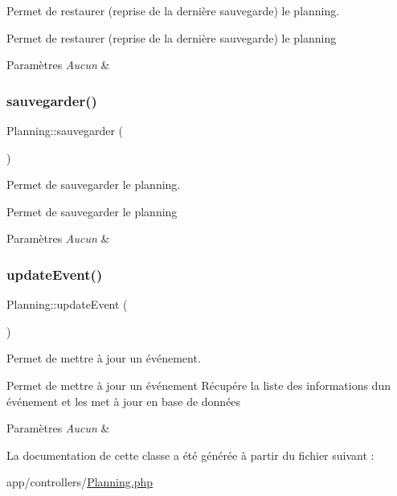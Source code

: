 Permet de restaurer (reprise de la dernière sauvegarde) le planning. 

Permet de restaurer (reprise de la dernière sauvegarde) le planning 
\begin{DoxyParams}{Paramètres}
{\em Aucun} & \\
\hline
\end{DoxyParams}
\mbox{\label{class_planning_aeb1146ae1c0a9e5f31214b9dbced1140}} 
\subsubsection{\texorpdfstring{sauvegarder()}{sauvegarder()}}
{\footnotesize\ttfamily Planning\+::sauvegarder (\begin{DoxyParamCaption}{ }\end{DoxyParamCaption})}



Permet de sauvegarder le planning. 

Permet de sauvegarder le planning 
\begin{DoxyParams}{Paramètres}
{\em Aucun} & \\
\hline
\end{DoxyParams}
\mbox{\label{class_planning_a98d895eb72d210bad07437f5b0a395b1}} 
\subsubsection{\texorpdfstring{update\+Event()}{updateEvent()}}
{\footnotesize\ttfamily Planning\+::update\+Event (\begin{DoxyParamCaption}{ }\end{DoxyParamCaption})}



Permet de mettre à jour un événement. 

Permet de mettre à jour un événement Récupére la liste des informations d\textquotesingle{}un événement et les met à jour en base de données 
\begin{DoxyParams}{Paramètres}
{\em Aucun} & \\
\hline
\end{DoxyParams}


La documentation de cette classe a été générée à partir du fichier suivant \+:\begin{DoxyCompactItemize}
\item 
app/controllers/\hyperlink{_planning_8php}{Planning.\+php}\end{DoxyCompactItemize}
